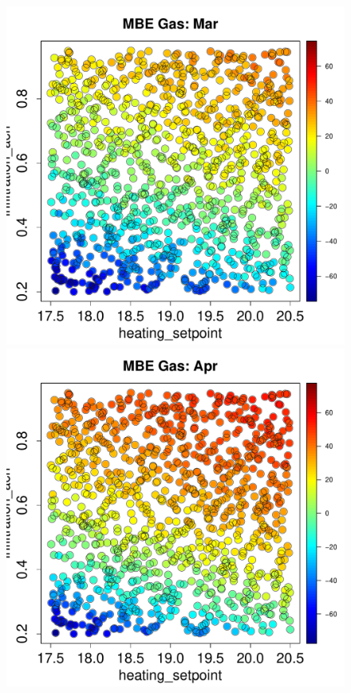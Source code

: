 \documentclass[a4paper, 12pt]{article}
\begin{document}
\begin{figure}
 \includegraphics[width=\scale]{MBE/MBE_Gas_03.pdf}\\
 \includegraphics[width=\scale]{MBE/MBE_Gas_04.pdf}

\end{figure}
\end{document}
